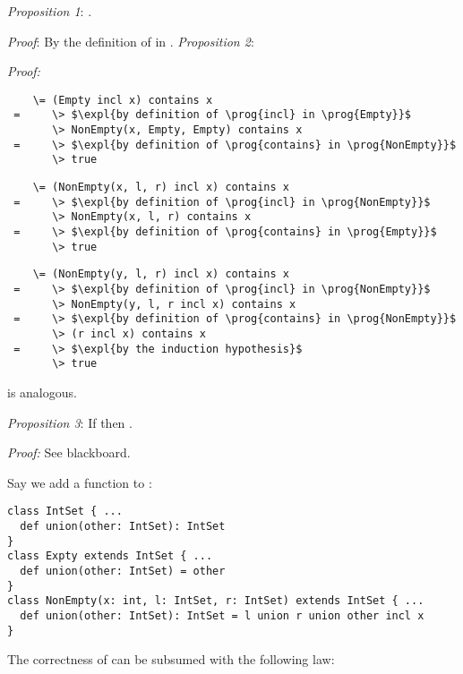 {\emph{Proposition 1}: .

\emph{Proof}: By the definition of  in .
\es\bs
\emph{Proposition 2}: 

\emph{Proof:}

\begin{lstlisting}
    \= (Empty incl x) contains x
 =     \> $\expl{by definition of \prog{incl} in \prog{Empty}}$
       \> NonEmpty(x, Empty, Empty) contains x
 =     \> $\expl{by definition of \prog{contains} in \prog{NonEmpty}}$
       \> true
\end{lstlisting}

\begin{lstlisting}
    \= (NonEmpty(x, l, r) incl x) contains x
 =     \> $\expl{by definition of \prog{incl} in \prog{NonEmpty}}$
       \> NonEmpty(x, l, r) contains x
 =     \> $\expl{by definition of \prog{contains} in \prog{Empty}}$
       \> true
\end{lstlisting}
\es\bs
{}
\begin{lstlisting}
    \= (NonEmpty(y, l, r) incl x) contains x
 =     \> $\expl{by definition of \prog{incl} in \prog{NonEmpty}}$
       \> NonEmpty(y, l, r incl x) contains x
 =     \> $\expl{by definition of \prog{contains} in \prog{NonEmpty}}$
       \> (r incl x) contains x
 =     \> $\expl{by the induction hypothesis}$
       \> true
\end{lstlisting}

 is analogous.

\bigskip

\emph{Proposition 3}: If  then
.

\emph{Proof:} See blackboard.
\es
{}

Say we add a  function to :

\begin{lstlisting}
class IntSet { ...
  def union(other: IntSet): IntSet
}
class Expty extends IntSet { ...
  def union(other: IntSet) = other
}
class NonEmpty(x: int, l: IntSet, r: IntSet) extends IntSet { ...
  def union(other: IntSet): IntSet = l union r union other incl x
}
\end{lstlisting}

The correctness of  can be subsumed with the following
law:

}
